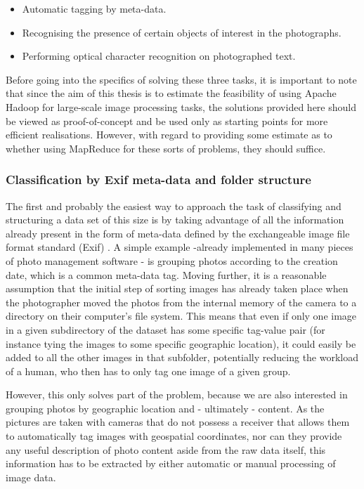 \documentclass [12pt,a4paper]{report}
\begin{document}
\begin{itemize} 
\item Automatic tagging by meta-data.
\item Recognising the presence of certain objects of interest in the photographs.
\item Performing optical character recognition on photographed text.
\end{itemize} 

Before going into the specifics of solving these three tasks, it is important to note that since the aim of this thesis is to estimate the feasibility of using Apache Hadoop for large-scale image processing tasks, the solutions provided here should be viewed as proof-of-concept and be used only as starting points for more efficient realisations. However, with regard to providing some estimate as to whether using MapReduce for these sorts of problems, they should suffice.

\subsubsection{Classification by Exif meta-data and folder structure}

The first and probably the easiest way to approach the task of classifying and structuring a data set of this size is by taking advantage of all the information already present in the form of meta-data defined by the exchangeable image file format standard (Exif) \cite{japan2002jeita}. A simple example -already implemented in many pieces of photo management software - is grouping photos according to the creation date, which is a common meta-data tag. Moving further, it is a reasonable assumption that the initial step of sorting images has already taken place when the photographer moved the photos from the internal memory of the camera to a directory on their computer's file system. This means that even if only one image in a given subdirectory of the dataset has some specific tag-value pair (for instance tying the images to some specific geographic location), it could easily be added to all the other images in that subfolder, potentially reducing the workload of a human, who then has to only tag one image of a given group.

However, this only solves part of the problem, because we are also interested in grouping photos by geographic location and - ultimately - content. As the pictures are taken with cameras that do not possess a receiver that allows them to automatically tag images with geospatial coordinates, nor can they provide any useful description of photo content aside from the raw data itself, this information has to be extracted by either automatic or manual processing of image data. 
\end{document}
